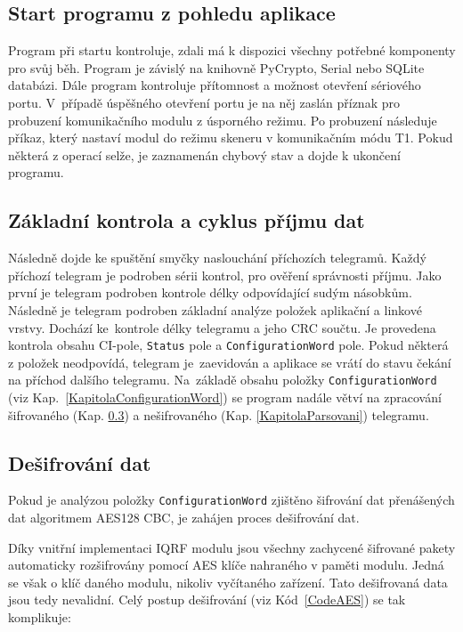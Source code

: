 \subsection{Start programu z pohledu aplikace}
Program při startu kontroluje, zdali  má k dispozici všechny potřebné komponenty pro svůj běh. Program je závislý na knihovně PyCrypto, Serial nebo SQLite databázi.
Dále program kontroluje přítomnost a možnost otevření sériového portu. V~případě úspěšného otevření portu je na něj zaslán příznak pro probuzení komunikačního modulu z úsporného režimu. Po probuzení následuje příkaz, který nastaví modul do režimu skeneru v komunikačním módu T1. Pokud některá z operací selže, je zaznamenán chybový stav a dojde k ukončení programu.

\subsection{Základní kontrola a cyklus příjmu dat}
Následně dojde ke spuštění smyčky naslouchání příchozích telegramů. Každý příchozí telegram je podroben sérii kontrol, pro ověření správnosti příjmu. Jako první je telegram podroben kontrole délky odpovídající sudým násobkům. Následně je telegram podroben základní analýze položek aplikační a linkové vrstvy. Dochází ke~kontrole délky telegramu a jeho CRC součtu. Je provedena kontrola obsahu CI-pole, \texttt{Status} pole a \texttt{ConfigurationWord} pole. Pokud některá z položek neodpovídá, telegram je~zaevidován a aplikace se vrátí do stavu čekání na příchod dalšího telegramu.
Na~základě obsahu položky \texttt{ConfigurationWord} (viz Kap.~\ref{KapitolaConfigurationWord}) se program nadále větví na zpracování šifrovaného (Kap. \ref{KapitolaDesifrovani}) a nešifrovaného (Kap. \ref{KapitolaParsovani}) telegramu.

\subsection{Dešifrování dat}
\label{KapitolaDesifrovani}
Pokud je analýzou položky \texttt{ConfigurationWord} zjištěno šifrování dat přenášených dat algoritmem AES128 CBC, je zahájen proces dešifrování dat.

Díky vnitřní implementaci IQRF modulu jsou všechny zachycené šifrované pakety automaticky rozšifrovány pomocí AES klíče nahraného v paměti modulu. Jedná se však o klíč daného modulu, nikoliv vyčítaného zařízení. Tato dešifrovaná data jsou tedy nevalidní. Celý postup dešifrování (viz Kód~\ref{CodeAES}) se tak komplikuje:

